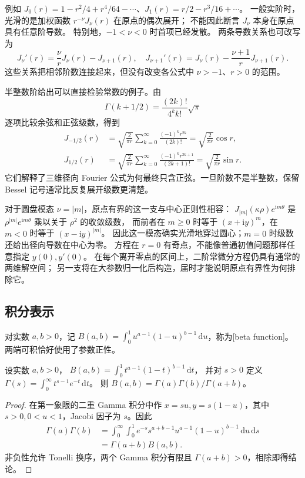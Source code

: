 例如 \(J_0(r)=1-r^2/4+r^4/64-\cdots\)、\(J_1(r)=r/2-r^3/16+\cdots\)。
一般实阶时，光滑的是加权函数 \(r^{-\nu}J_\nu(r)\) 在原点的偶次展开；
不能因此断言 \(J_\nu\) 本身在原点具有任意阶导数。
特别地，\(-1<\nu<0\) 时首项已经发散。
两条导数关系也可改写为
\[
 J_\nu'(r)=\frac{\nu}{r}J_\nu(r)-J_{\nu+1}(r),\quad
 J_{\nu+1}'(r)=J_\nu(r)-\frac{\nu+1}{r}J_{\nu+1}(r).
\]
这些关系把相邻阶数连接起来，但没有改变各公式中 \(\nu>-1\)、\(r>0\) 的范围。

\ProseParagraphBreak
半整数阶给出可以直接检验常数的例子。由
\[
 \Gamma(k+1/2)=\frac{(2k)!}{4^kk!}\sqrt\pi
\]
逐项比较余弦和正弦级数，得到
\[
 \begin{aligned}
 J_{-1/2}(r)
 &=\sqrt{\frac2{\pi r}}
 \sum_{k=0}^\infty\frac{(-1)^kr^{2k}}{(2k)!}
 =\sqrt{\frac2{\pi r}}\cos r,\\
 J_{1/2}(r)
 &=\sqrt{\frac2{\pi r}}
 \sum_{k=0}^\infty\frac{(-1)^kr^{2k+1}}{(2k+1)!}
 =\sqrt{\frac2{\pi r}}\sin r.
 \end{aligned}
\]
它们解释了三维径向 Fourier 公式为何最终只含正弦。一旦阶数不是半整数，保留 Bessel 记号通常比反复展开级数更清楚。

\ProseParagraphBreak

对于圆盘模态 \(\nu=|m|\)，原点有界的这一支与中心正则性相容：
\(J_{|m|}(\kappa\rho)e^{\mathrm im\theta}\) 是
\(\rho^{|m|}e^{\mathrm im\theta}\) 乘以关于 \(\rho^2\) 的收敛级数，
而前者在 \(m\geq0\) 时等于 \((x+\mathrm iy)^m\)，在 \(m<0\) 时等于
\((x-\mathrm iy)^{|m|}\)。
因此这一模态确实光滑地穿过圆心；\(m=0\) 时级数还给出径向导数在中心为零。
方程在 \(r=0\) 有奇点，不能像普通初值问题那样任意指定 \(y(0),y'(0)\)。
在每个离开零点的区间上，二阶常微分方程仍具有通常的两维解空间；
另一支将在大参数归一化后构造，届时才能说明原点有界性为何排除它。

\subsection{积分表示}
\label{b2:subsec:A20102}

对实数 \(a,b>0\)，记 \(B(a,b)=\int_0^1u^{a-1}(1-u)^{b-1}\,\mathrm du\)，称为[beta function]。两端可积恰好使用了参数正性。
\begin{lemma}\label{b2:lem:A2-beta-integral}
设实数 \(a,b>0\)，
\(B(a,b)=\int_0^1t^{a-1}(1-t)^{b-1}\,\mathrm dt\)，
并对 \(s>0\) 定义 \(\Gamma(s)=\int_0^\infty t^{s-1}e^{-t}\,\mathrm dt\)。
则 \(B(a,b)=\Gamma(a)\Gamma(b)/\Gamma(a+b)\)。
\end{lemma}
\begin{proof}
在第一象限的二重 Gamma 积分中作 \(x=su,y=s(1-u)\)，其中 \(s>0,0<u<1\)，Jacobi 因子为 \(s\)。因此
\[
 \begin{aligned}
 \Gamma(a)\Gamma(b)
 &=\int_0^\infty\int_0^1
 e^{-s}s^{a+b-1}u^{a-1}(1-u)^{b-1}\,\mathrm du\,\mathrm ds\\
 &=\Gamma(a+b)B(a,b).
 \end{aligned}
\]
非负性允许 Tonelli 换序，两个 Gamma 积分有限且 \(\Gamma(a+b)>0\)，相除即得结论。
\end{proof}

